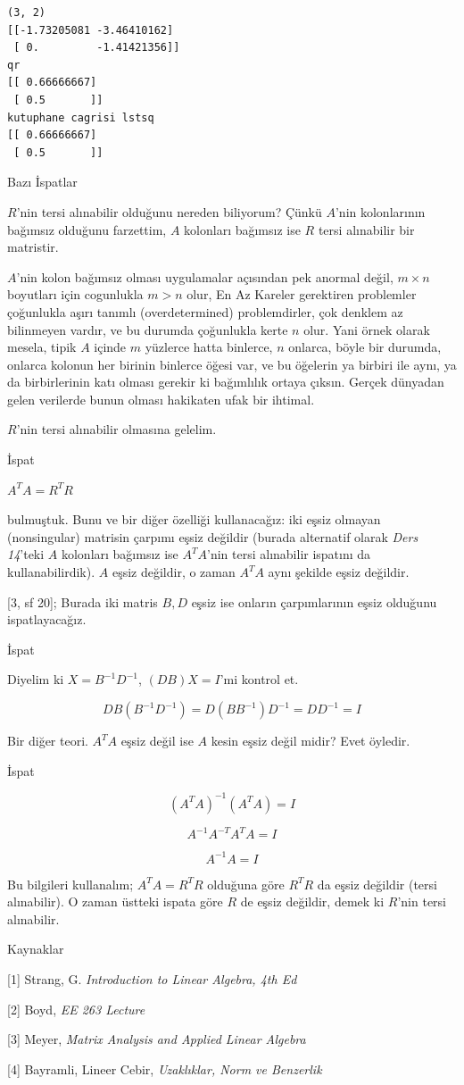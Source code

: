 \documentclass[12pt,fleqn]{article}\usepackage{../../common}
\begin{document}
\begin{verbatim}
(3, 2) 
[[-1.73205081 -3.46410162]
 [ 0.         -1.41421356]]
qr
[[ 0.66666667]
 [ 0.5       ]]
kutuphane cagrisi lstsq
[[ 0.66666667]
 [ 0.5       ]]
\end{verbatim}

Bazı İspatlar

$R$'nin tersi alınabilir olduğunu nereden biliyorum? Çünkü $A$'nin
kolonlarının bağımsız olduğunu farzettim, $A$ kolonları bağımsız ise
$R$ tersi alınabilir bir matristir. 

$A$'nin kolon bağımsız olması uygulamalar açısından pek anormal değil, $m
\times n$ boyutları için cogunlukla $m > n$ olur, En Az Kareler gerektiren
problemler çoğunlukla aşırı tanımlı (overdetermined) problemdirler, çok
denklem az bilinmeyen vardır, ve bu durumda çoğunlukla kerte $n$ olur. Yani
örnek olarak mesela, tipik $A$ içinde $m$ yüzlerce hatta binlerce, $n$
onlarca, böyle bir durumda, onlarca kolonun her birinin binlerce öğesi var,
ve bu öğelerin ya birbiri ile aynı, ya da birbirlerinin katı olması gerekir
ki bağımlılık ortaya çıksın. Gerçek dünyadan gelen verilerde bunun olması
hakikaten ufak bir ihtimal.

$R$'nin tersi alınabilir olmasına gelelim.

İspat

$A^TA = R^TR$

bulmuştuk. Bunu ve bir diğer özelliği kullanacağız: iki eşsiz olmayan
(nonsingular) matrisin çarpımı eşsiz değildir (burada alternatif olarak
{\em Ders 14}'teki $A$ kolonları bağımsız ise $A^TA$'nin tersi alınabilir
ispatını da kullanabilirdik). $A$ eşsiz değildir, o zaman $A^TA$ aynı
şekilde eşsiz değildir.

[3, sf 20]; Burada iki matris $B,D$ eşsiz ise onların çarpımlarının eşsiz
olduğunu ispatlayacağız. 

İspat

Diyelim ki $X=B^{-1}D^{-1}$, $(DB)X=I$'mi kontrol et.

$$ DB (B^{-1}D^{-1}) = D(BB^{-1})D^{-1} = DD^{-1} = I $$

Bir diğer teori. $A^TA$ eşsiz değil ise $A$ kesin eşsiz değil midir? Evet
öyledir.

İspat

$$ (A^TA)^{-1} (A^TA)= I $$

$$ A^{-1}A^{-T}A^TA = I$$

$$ A^{-1}A = I$$

Bu bilgileri kullanalım; $A^TA = R^TR$ olduğuna göre $R^TR$ da eşsiz
değildir (tersi alınabilir). O zaman üstteki ispata göre $R$ de eşsiz
değildir, demek ki $R$'nin tersi alınabilir.

Kaynaklar 

[1] Strang, G. {\em Introduction to Linear Algebra, 4th Ed}

[2] Boyd, {\em EE 263 Lecture}

[3] Meyer, {\em Matrix Analysis and Applied Linear Algebra}

[4] Bayramli, Lineer Cebir, {\em Uzaklıklar, Norm ve Benzerlik}
\end{document}
